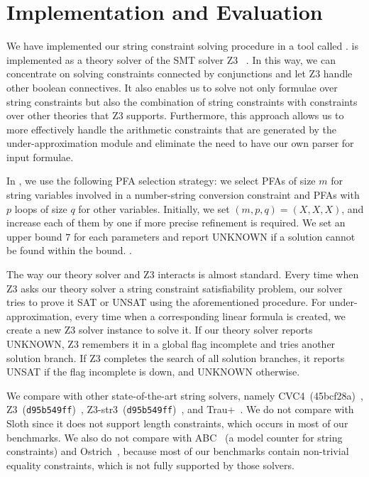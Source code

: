 \section{Implementation and Evaluation}
\label{section:evaluation}

We have implemented our string constraint solving procedure in a tool called {\tool}. {\tool} is implemented as a theory solver of the SMT solver Z3~\cite{z3} . In this way, we can concentrate on solving constraints connected by conjunctions and let Z3 handle other boolean connectives. It also enables us to solve not only formulae over string constraints but also the combination of string constraints with constraints over other theories that Z3 supports. Furthermore, this approach allows us to more effectively handle the arithmetic constraints that are generated by the under-approximation module and eliminate the need to have our own parser for input formulae. 

In {\tool}, we use the following PFA selection strategy: we select PFAs of size $m$ for string variables involved in a number-string conversion constraint and PFAs with $p$ loops of size $q$ for other variables. Initially, we set $(m,p,q)=(X,X,X)$, and increase each of them by one if more precise refinement is required. We set an upper bound $7$ for each parameters and report UNKNOWN if a solution cannot be found within the bound. .

The way our theory solver and Z3 interacts is almost standard. Every time when Z3 asks our theory solver a string constraint satisfiability problem, our solver tries to prove it SAT or UNSAT using the aforementioned procedure. For under-approximation, every time when a corresponding linear formula is created, we create a new Z3 solver instance to solve it. If our theory solver reports UNKNOWN, Z3 remembers it in a global flag \textsf{incomplete} and tries another solution branch. If Z3 completes the search of all solution branches, it reports UNSAT if the flag \textsf{incomplete} is down, and UNKNOWN otherwise.

We compare {\tool} with other state-of-the-art string solvers, namely CVC4~(45bcf28a)~\cite{cvc4Tool}, Z3~(\texttt{d95b549ff})~\cite{z3}, \textsf{Z3-str3}~(\texttt{d95b549ff})~\cite{zheng2013z3}, and \textsf{Trau+}~\cite{abdulla2019chain}. We do not compare with Sloth \cite{sloth} since it does not support length constraints, which occurs in most of our benchmarks. We also do not compare with ABC~\cite{aydin2018parameterized} (a model counter for string constraints) and Ostrich~\cite{chen2019decision}, because most of our benchmarks contain non-trivial equality constraints, which is not fully supported by those solvers.


